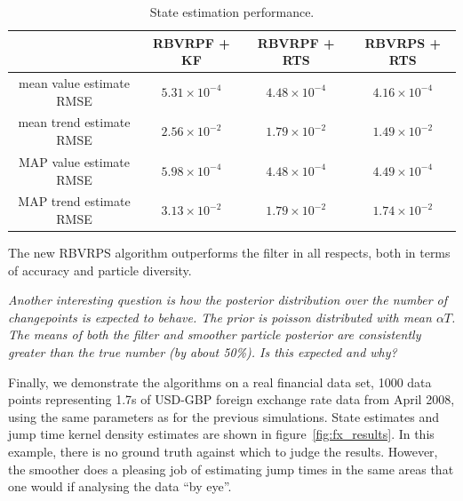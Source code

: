 \documentclass[journal]{IEEEtran}
\newenvironment{meta}[0]{\color{red} \em}{}
\begin{document}
\begin{table}%
\begin{tabular}{|c|c|c|c|}
\hline
 & RBVRPF + KF & RBVRPF + RTS & RBVRPS + RTS \\
\hline
mean value estimate RMSE   & $5.31 \times 10^{-4}$ & $4.48 \times 10^{-4}$ & $4.16 \times 10^{-4}$ \\
mean trend estimate RMSE   & $2.56 \times 10^{-2}$ & $1.79 \times 10^{-2}$ & $1.49 \times 10^{-2}$ \\
MAP value estimate RMSE    & $5.98 \times 10^{-4}$ & $4.48 \times 10^{-4}$ & $4.49 \times 10^{-4}$ \\
MAP trend estimate RMSE    & $3.13 \times 10^{-2}$ & $1.79 \times 10^{-2}$ & $1.74 \times 10^{-2}$ \\
\hline
\end{tabular}
\caption{State estimation performance.}
\label{tab:state_performance}
\end{table}

The new RBVRPS algorithm outperforms the filter in all respects, both in terms of accuracy and particle diversity.

\begin{meta}
Another interesting question is how the posterior distribution over the number of changepoints is expected to behave. The prior is poisson distributed with mean $\alpha T$. The means of both the filter and smoother particle posterior are consistently greater than the true number (by about 50\%). Is this expected and why?
\end{meta}

Finally, we demonstrate the algorithms on a real financial data set, 1000 data points representing 1.7s of USD-GBP foreign exchange rate data from April 2008, using the same parameters as for the previous simulations. State estimates and jump time kernel density estimates are shown in figure~\ref{fig:fx_results}. In this example, there is no ground truth against which to judge the results. However, the smoother does a pleasing job of estimating jump times in the same areas that one would if analysing the data ``by eye''.
\end{document}
